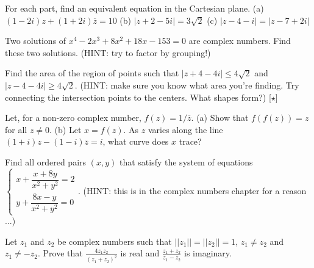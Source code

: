 \documentclass[../book.tex]{subfiles}
\begin{document}
\begin{challengeset}
\item For each part, find an equivalent equation in the Cartesian plane.  \newline 
(a) $(1-2i)z+(1+2i)\overline{z}=10$ \newline 
(b) $|z+2-5i|=3\sqrt{2}$ \newline 
(c) $|z-4-i|=|z-7+2i|$ \vspace{3mm}

\item Two solutions of $x^4-2x^3+8x^2+18x-153=0$ are complex numbers.  Find these two solutions.  (HINT: try to factor by grouping!) \vspace{3mm}

\item Find the area of the region of points such that $|z+4-4i|\leq 4\sqrt{2}$ and $|z-4-4i|\geq 4\sqrt{2}$.  (HINT: make sure you know what area you're finding.  Try connecting the intersection points to the centers.  What shapes form?) [$\star$]\vspace{3mm}

\item Let, for a non-zero complex number, $f(z)=1/\overline{z}$.  \newline 
(a) Show that $f(f(z))=z$ for all $z\neq 0$.  \newline 
(b) Let $x=f(z)$.  As $z$ varies along the line $(1+i)z-(1-i)\overline{z}=i$, what curve does $x$ trace?\vspace{3mm}

\item Find all ordered pairs $(x,y)$ that satisfy the system of equations $\begin{cases} x+\dfrac{x+8y}{x^2+y^2}=2 \\ y+\dfrac{8x-y}{x^2+y^2}=0 \end{cases}$.  (HINT: this is in the complex numbers chapter for a reason ...)\vspace{3mm}

\item Let $z_1$ and $z_2$ be complex numbers such that $||z_1||=||z_2||=1$, $z_1\neq z_2$ and $z_1\neq -z_2$.  Prove that $\displaystyle \frac{4z_1z_2}{\left(z_1+z_2\right)^2}$ is real and $\displaystyle \frac{z_1+z_2}{z_1-z_2}$ is imaginary.
\end{challengeset}
\end{document}
